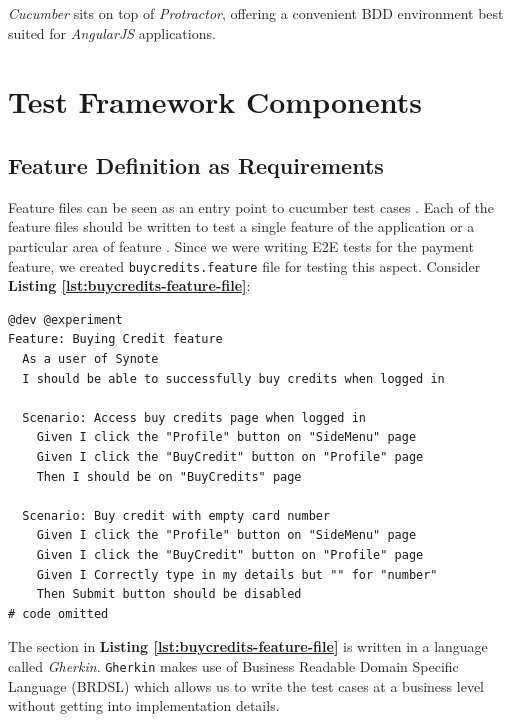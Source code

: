 \textit{Cucumber} sits on top of \textit{Protractor}, offering a convenient BDD environment best suited for \textit{AngularJS} applications.

\section{Test Framework Components}
\label{sec:test-framework-components}

\subsection{Feature Definition as Requirements}
\label{subsec:feautre-definition-as-requirements}

Feature files can be seen as an entry point to cucumber test cases \cite{featurefile1}. Each of the feature files should be written to test a single feature of the application or a particular area of feature \cite{featurefile2}. Since we were writing E2E tests for the payment feature, we created \texttt{buycredits.feature} file for testing this aspect. Consider \textbf{Listing \ref{lst:buycredits-feature-file}}:\\

\begin{listing}[H]
\begin{verbatim}
@dev @experiment
Feature: Buying Credit feature
  As a user of Synote
  I should be able to successfully buy credits when logged in

  Scenario: Access buy credits page when logged in
    Given I click the "Profile" button on "SideMenu" page
    Given I click the "BuyCredit" button on "Profile" page
    Then I should be on "BuyCredits" page

  Scenario: Buy credit with empty card number
    Given I click the "Profile" button on "SideMenu" page
    Given I click the "BuyCredit" button on "Profile" page
    Given I Correctly type in my details but "" for "number"
    Then Submit button should be disabled
# code omitted
\end{verbatim}
\label{lst:buycredits-feature-file}
\end{listing}

The section in \textbf{Listing \ref{lst:buycredits-feature-file}} is written in a language called \textit{Gherkin}. \texttt{Gherkin} makes use of Business Readable Domain Specific Language (BRDSL) which allows us to write the test cases at a business level without getting into implementation details.\\

